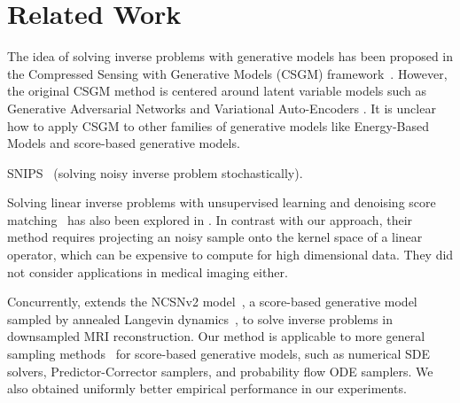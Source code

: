 \section{Related Work}
The idea of solving inverse problems with generative models has been proposed in the Compressed Sensing with Generative Models (CSGM) framework~\citep{bora2017compressed}. However, the original CSGM method is centered around latent variable models such as Generative Adversarial Networks \citep[GANs,][]{goodfellow2014generative} and Variational Auto-Encoders \cite[VAEs,][]{kingma-AutoEncodingVariationalBayes-2014,rezende-StochasticBackpropagationApproximate-2014}. It is unclear how to apply CSGM to other families of generative models like Energy-Based Models \citep[EBMs,][]{song2021train} and score-based generative models.

SNIPS~\cite{kawar2021snips} (solving noisy inverse problem stochastically).

Solving linear inverse problems with unsupervised learning and denoising score matching~\citep{vincent2011connection} has also been explored in \citet{kadkhodaie2020solving}. In contrast with our approach, their method requires projecting an noisy sample onto the kernel space of a linear operator, which can be expensive to compute for high dimensional data. They did not consider applications in medical imaging either.

Concurrently, \citet{jalal2020robust} extends the NCSNv2 model~\citep{song2020improved}, a score-based generative model sampled by annealed Langevin dynamics~\citep{song2019generative}, to solve inverse problems in downsampled MRI reconstruction. Our method is applicable to more general sampling methods~\citep{song2021scorebased} for score-based generative models, such as numerical SDE solvers, Predictor-Corrector samplers, and probability flow ODE samplers. We also obtained uniformly better empirical performance in our experiments.

